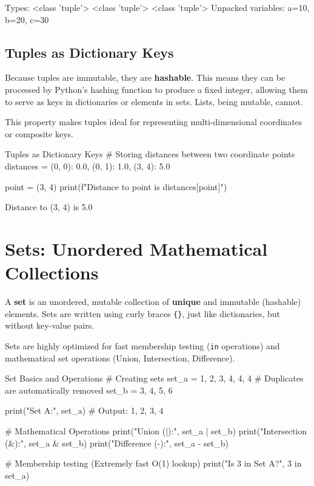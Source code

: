 \begin{outputbox}
Types: <class 'tuple'> <class 'tuple'> <class 'tuple'>
Unpacked variables: a=10, b=20, c=30
\end{outputbox}

\subsection{Tuples as Dictionary Keys}
Because tuples are immutable, they are \textbf{hashable}. This means they can be processed by Python's hashing function to produce a fixed integer, allowing them to serve as keys in dictionaries or elements in sets. Lists, being mutable, cannot.

This property makes tuples ideal for representing multi-dimensional coordinates or composite keys.

\begin{pythoncode}[]{Tuples as Dictionary Keys}
# Storing distances between two coordinate points
distances = {
    (0, 0): 0.0,
    (0, 1): 1.0,
    (3, 4): 5.0
}

point = (3, 4)
print(f"Distance to {point} is {distances[point]}")
\end{pythoncode}

\begin{outputbox}
Distance to (3, 4) is 5.0
\end{outputbox}

\section{Sets: Unordered Mathematical Collections}

A \textbf{set} is an unordered, mutable collection of \textbf{unique} and immutable (hashable) elements. Sets are written using curly braces \texttt{\{\}}, just like dictionaries, but without key-value pairs. 

Sets are highly optimized for fast membership testing (\texttt{in} operations) and mathematical set operations (Union, Intersection, Difference).

\begin{pythoncode}[]{Set Basics and Operations}
# Creating sets
set_a = {1, 2, 3, 4, 4, 4} # Duplicates are automatically removed
set_b = {3, 4, 5, 6}

print("Set A:", set_a) # Output: {1, 2, 3, 4}

# Mathematical Operations
print("Union (|):", set_a | set_b)
print("Intersection (&):", set_a & set_b)
print("Difference (-):", set_a - set_b)

# Membership testing (Extremely fast O(1) lookup)
print("Is 3 in Set A?", 3 in set_a)
\end{pythoncode}

